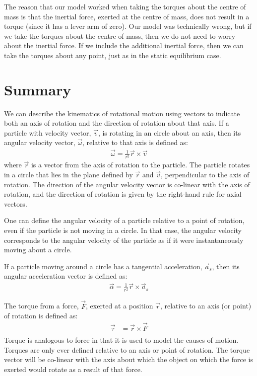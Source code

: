 The reason that our model worked when taking the torques about the centre of mass is that the inertial force, exerted at the centre of mass, does not result in a torque (since it has a lever arm of zero). Our model was technically wrong, but if we take the torques about the centre of mass, then we do not need to worry about the inertial force. If we include the additional inertial force, then we can take the torques about any point, just as in the static equilibrium case.

\newpage
\section{Summary}
\vspace{-0.4cm}
\begin{chapterSummary}
We can describe the kinematics of rotational motion using vectors to indicate both an axis of rotation and the direction of rotation about that axis. If a particle with velocity vector, $\vec v$, is rotating in an circle about an axis, then its angular velocity vector, $\vec\omega$, relative to that axis is defined as:
\begin{align*}
\vec\omega = \frac{1}{r^2}\vec r \times \vec v
\end{align*}
where $\vec r$ is a vector from the axis of rotation to the particle. The particle rotates in a circle that lies in the plane defined by $\vec r$ and $\vec v$, perpendicular to the axis of rotation. The direction of the angular velocity vector is co-linear with the axis of rotation, and the direction of rotation is given by the right-hand rule for axial vectors. 

One can define the angular velocity of a particle relative to a point of rotation, even if the particle is not moving in a circle. In that case, the angular velocity corresponds to the angular velocity of the particle as if it were instantaneously moving about a circle. 

If a particle moving around a circle has a tangential acceleration, $\vec a_s$, then its angular acceleration vector is defined as:
\begin{align*}
\vec\alpha = \frac{1}{r^2}\vec r \times \vec a_s
\end{align*}


The torque from a force, $\vec F$, exerted at a position $\vec r$, relative to an axis (or point) of rotation is defined as:
\begin{align*}
\vec\tau &= \vec r \times \vec F\\
\end{align*}
Torque is analogous to force in that it is used to model the causes of motion. Torques are only ever defined relative to an axis or point of rotation. The torque vector will be co-linear with the axis about which the object on which the force is exerted would rotate as a result of that force.


\end{chapterSummary}
